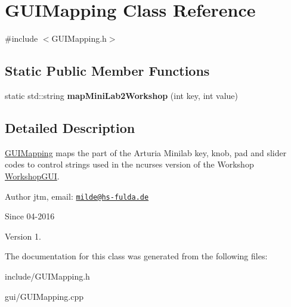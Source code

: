 \hypertarget{classGUIMapping}{}\section{G\+U\+I\+Mapping Class Reference}
\label{classGUIMapping}


{\ttfamily \#include $<$G\+U\+I\+Mapping.\+h$>$}

\subsection*{Static Public Member Functions}
\begin{DoxyCompactItemize}
\item 
static std\+::string {\bfseries map\+Mini\+Lab2\+Workshop} (int key, int value)\hypertarget{classGUIMapping_afc4d931e878ba22a7530d39c66c3a966}{}\label{classGUIMapping_afc4d931e878ba22a7530d39c66c3a966}

\end{DoxyCompactItemize}


\subsection{Detailed Description}
\hyperlink{classGUIMapping}{G\+U\+I\+Mapping} maps the part of the Arturia Minilab key, knob, pad and slider codes to control strings used in the ncurses version of the Workshop \hyperlink{classWorkshopGUI}{Workshop\+G\+UI}.

\begin{DoxyAuthor}{Author}
jtm, email\+:  \href{mailto:milde@hs-fulda.de}{\tt milde@hs-\/fulda.\+de} 
\end{DoxyAuthor}
\begin{DoxySince}{Since}
04-\/2016 
\end{DoxySince}
\begin{DoxyVersion}{Version}
1. 
\end{DoxyVersion}


The documentation for this class was generated from the following files\+:\begin{DoxyCompactItemize}
\item 
include/G\+U\+I\+Mapping.\+h\item 
gui/G\+U\+I\+Mapping.\+cpp\end{DoxyCompactItemize}

